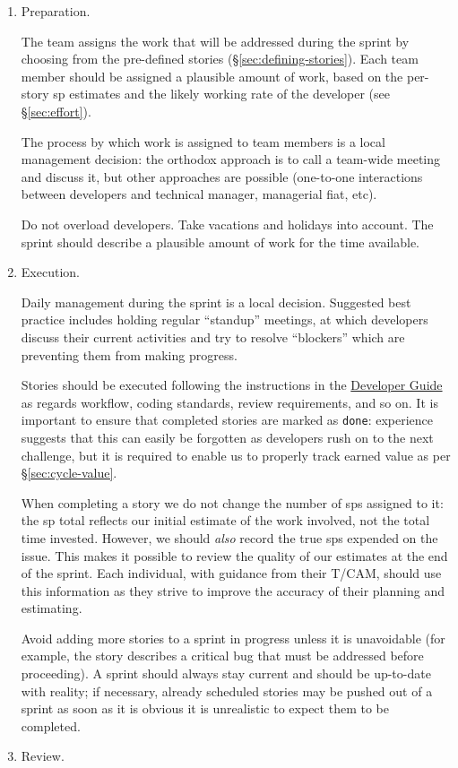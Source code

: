 \begin{enumerate}
\item
  Preparation.

  The team assigns the work that will be addressed during the sprint by choosing from the pre-defined stories (\S\ref{sec:defining-stories}).
  Each team member should be assigned a plausible amount of work, based on the per-\gls{story} \gls{sp} estimates and the likely working rate of the developer (see \S\ref{sec:effort}).

  The process by which work is assigned to team members is a local
  management decision: the orthodox approach is to call a team-wide
  meeting and discuss it, but other approaches are possible (one-to-one
  interactions between developers and technical manager, managerial
  fiat, etc).

  Do not overload developers. Take vacations and holidays into account.
  The sprint should describe a plausible amount of work for the time
  available.
\item
  Execution.

  Daily management during the sprint is a local decision. Suggested best
  practice includes holding regular ``standup'' meetings, at which
  developers discuss their current activities and try to resolve
  ``blockers'' which are preventing them from making progress.

  Stories should be executed following the instructions in the
  \href{http://developer.lsst.io/}{Developer Guide} as regards workflow,
  coding standards, review requirements, and so on. It is important to
  ensure that completed stories are marked as \texttt{done}:
  experience suggests that this can easily be forgotten as developers
  rush on to the next challenge, but it is required to enable us to
  properly track earned value as per \S\ref{sec:cycle-value}.

  When completing a \gls{story} we do not change the number of \glspl{sp} assigned to
  it: the \gls{sp} total reflects our initial estimate of the work involved,
  not the total time invested.
  However, we should \textit{also} record the true \glspl{sp} expended on the issue.
  This makes it possible to review the quality of our estimates at the end of the sprint.
  Each individual, with guidance from their T/CAM, should use this information as they strive to improve the accuracy of their planning and estimating.

  Avoid adding more stories to a sprint in progress unless it is
  unavoidable (for example, the \gls{story} describes a critical bug that must
  be addressed before proceeding). A sprint should always stay current
  and should be up-to-date with reality; if necessary, already scheduled
  stories may be pushed out of a sprint as soon as it is obvious it is
  unrealistic to expect them to be completed.
\item
  Review.


\end{enumerate}
